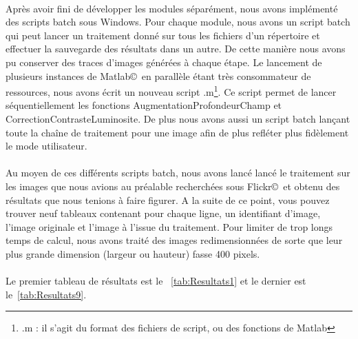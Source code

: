 \documentclass[11pt, french,screen]{report-rd-info}
\begin{document}
\paragraph*{}
Après avoir fini de développer les modules séparément, nous avons implémenté des scripts batch sous Windows. Pour chaque module, nous avons un script batch qui peut lancer un traitement donné sur tous les fichiers d'un répertoire et effectuer la sauvegarde des résultats dans un autre. De cette manière nous avons pu conserver des traces d'images générées à chaque étape. Le lancement de plusieurs instances de Matlab\copyright~en parallèle étant très consommateur de ressources, nous avons écrit un nouveau script .m\footnote{.m : il s'agit du format des fichiers de script, ou des fonctions de Matlab}. Ce script permet de lancer séquentiellement les fonctions AugmentationProfondeurChamp et CorrectionContrasteLuminosite. De plus nous avons aussi un script batch lançant toute la chaîne de traitement pour une image afin de plus refléter plus fidèlement le mode utilisateur. 

\paragraph*{}
Au moyen de ces différents scripts batch, nous avons lancé lancé le traitement sur les images que nous avions au préalable recherchées sous Flickr\copyright~et obtenu des résultats que nous tenions à faire figurer. A la suite de ce point, vous pouvez trouver neuf tableaux contenant pour chaque ligne, un identifiant d'image, l'image originale et l'image à l'issue du traitement. Pour limiter de trop longs temps de calcul, nous avons traité des images redimensionnées de sorte que leur plus grande dimension (largeur ou hauteur) fasse 400 pixels.   

\paragraph*{}
Le premier tableau de résultats est le ~\ref{tab:Resultats1} et le dernier est le~\ref{tab:Resultats9}.
\end{document}
